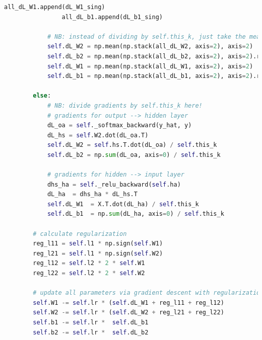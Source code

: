 \documentclass[reqno]{amsart}
\theoremstyle{definition}
\theoremstyle{remark}
\numberwithin{equation}{section}
\begin{document}
\begin{lstlisting}[language=Python]
                all_dL_W1.append(dL_W1_sing)                                    
                all_dL_b1.append(dL_b1_sing)                                    
                                                                                
            # NB: instead of dividing by self.this_k, just take the mean        
            self.dL_W2 = np.mean(np.stack(all_dL_W2, axis=2), axis=2)           
            self.dL_b2 = np.mean(np.stack(all_dL_b2, axis=2), axis=2).ravel()   
            self.dL_W1 = np.mean(np.stack(all_dL_W1, axis=2), axis=2)           
            self.dL_b1 = np.mean(np.stack(all_dL_b1, axis=2), axis=2).ravel()   
                                                                                
        else:                                                                   
            # NB: divide gradients by self.this_k here!                         
            # gradients for output --> hidden layer                             
            dL_oa = self._softmax_backward(y_hat, y)          
            dL_hs = self.W2.dot(dL_oa.T)                      
            self.dL_W2 = self.hs.T.dot(dL_oa) / self.this_k  
            self.dL_b2 = np.sum(dL_oa, axis=0) / self.this_k  
                                                                                
            # gradients for hidden --> input layer                              
            dhs_ha = self._relu_backward(self.ha)           
            dL_ha  = dhs_ha * dL_hs.T                         
            self.dL_W1  = X.T.dot(dL_ha) / self.this_k        
            self.dL_b1  = np.sum(dL_ha, axis=0) / self.this_k
            
        # calculate regularization                                              
        reg_l11 = self.l1 * np.sign(self.W1)                                    
        reg_l21 = self.l1 * np.sign(self.W2)                                    
        reg_l12 = self.l2 * 2 * self.W1                                         
        reg_l22 = self.l2 * 2 * self.W2                                         
                                                                                
        # update all parameters via gradient descent with regularization        
        self.W1 -= self.lr * (self.dL_W1 + reg_l11 + reg_l12)                   
        self.W2 -= self.lr * (self.dL_W2 + reg_l21 + reg_l22)                   
        self.b1 -= self.lr *  self.dL_b1                                        
        self.b2 -= self.lr *  self.dL_b2   
\end{lstlisting}
\end{document}
